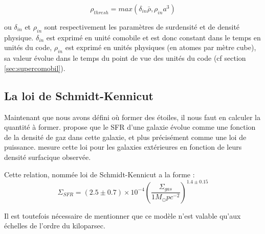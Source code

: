 
\begin{equation}
	\rho_{thresh} = max\left(  \delta_{in} \bar{\rho}, \rho_{in} a^3 \right)
\end{equation} 

ou $\delta_{in}$ et $\rho_{in}$  sont respectivement les paramètres de surdensité et de densité physique.
$\delta_{in}$ est exprimé en unité comobile et est donc constant dans le temps en unités du code,
 $\rho_{in}$ est exprimé en unités physiques (en atomes par mètre cube), sa valeur évolue dans le temps du point de vue des unités du code (cf section \ref{sec:supercomobil}).


\subsection{La loi de Schmidt-Kennicut}
\label{sec:schmidt-kennicut}

Maintenant que nous avons défini où former des étoiles, il nous faut en calculer la quantité à former.
\cite{1959ApJ...129..243S} propose que le \ac{SFR} d'une galaxie évolue comme une fonction de la densité de gaz dans cette galaxie, et plus précisément comme une loi de puissance.
\cite{1998ApJ...498..541K} mesure cette loi pour les galaxies extérieures en fonction de leurs densité surfacique observée.

Cette relation, nommée loi de Schmidt-Kennicut a la forme :
\begin{equation}
\Sigma_{SFR} = (2.5 \pm 0.7) \times 10^{-4} \left( \frac{\Sigma_{gas}}{1 M_\odot pc^{-2}} \right)^{1.4 \pm 0.15}
\end{equation}

Il est toutefois nécessaire de mentionner que ce modèle n'est valable qu'aux échelles de l'ordre du kiloparsec. %

%
%

